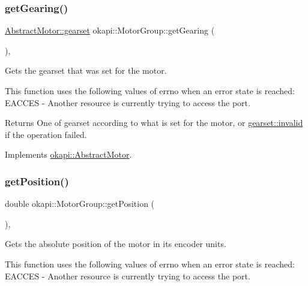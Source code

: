 \subsubsection{\texorpdfstring{getGearing()}{getGearing()}}
{\footnotesize\ttfamily \mbox{\hyperlink{classokapi_1_1AbstractMotor_a88aaa6ea2fa10f5520a537bbf26774d5}{Abstract\+Motor\+::gearset}} okapi\+::\+Motor\+Group\+::get\+Gearing (\begin{DoxyParamCaption}{ }\end{DoxyParamCaption})\hspace{0.3cm}{\ttfamily [override]}, {\ttfamily [virtual]}}

Gets the gearset that was set for the motor.

This function uses the following values of errno when an error state is reached\+: E\+A\+C\+C\+ES -\/ Another resource is currently trying to access the port.

\begin{DoxyReturn}{Returns}
One of gearset according to what is set for the motor, or \mbox{\hyperlink{classokapi_1_1AbstractMotor_a88aaa6ea2fa10f5520a537bbf26774d5afedb2d84cafe20862cb4399751a8a7e3}{gearset\+::invalid}} if the operation failed. 
\end{DoxyReturn}


Implements \mbox{\hyperlink{classokapi_1_1AbstractMotor_adc90f1fc8af6c34c4e833355693474bb}{okapi\+::\+Abstract\+Motor}}.

\mbox{\label{classokapi_1_1MotorGroup_a6bf3c5a2f5caf0e5b02e8dcf2e8130d9}} 
\subsubsection{\texorpdfstring{getPosition()}{getPosition()}}
{\footnotesize\ttfamily double okapi\+::\+Motor\+Group\+::get\+Position (\begin{DoxyParamCaption}{ }\end{DoxyParamCaption})\hspace{0.3cm}{\ttfamily [override]}, {\ttfamily [virtual]}}

Gets the absolute position of the motor in its encoder units.

This function uses the following values of errno when an error state is reached\+: E\+A\+C\+C\+ES -\/ Another resource is currently trying to access the port.

